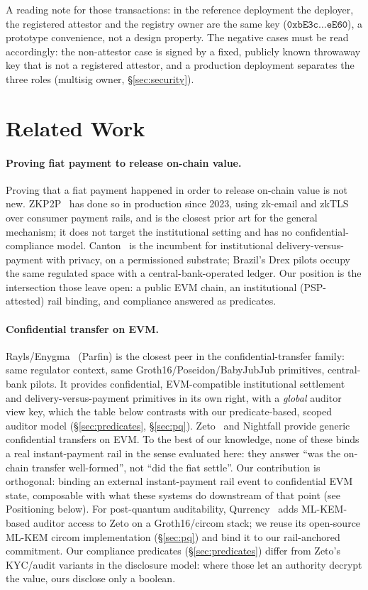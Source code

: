 \documentclass[11pt]{article}
\begin{document}
A reading note for those transactions: in the reference deployment the
deployer, the registered attestor and the registry owner are the same key
($\mathtt{0xbE3c}\ldots\mathtt{eE60}$), a prototype convenience, not a design
property. The negative cases must be read accordingly: the non-attestor case is
signed by a fixed, publicly known throwaway key that is not a registered
attestor, and a production deployment separates the three roles (multisig
owner, \S\ref{sec:security}).

\section{Related Work}
\label{sec:relatedwork}

\paragraph{Proving fiat payment to release on-chain value.}
Proving that a fiat payment happened in order to release on-chain value is not
new. ZKP2P~\cite{zkp2p} has done so in production since 2023, using zk-email
and zkTLS over consumer payment rails, and is the closest prior art for the
general mechanism; it does not target the institutional setting and has no
confidential-compliance model. Canton~\cite{canton} is the incumbent for
institutional delivery-versus-payment with privacy, on a permissioned
substrate; Brazil's Drex pilots occupy the same regulated space with a
central-bank-operated ledger. Our position is the intersection those leave
open: a public EVM chain, an institutional (PSP-attested) rail binding, and
compliance answered as predicates.

\paragraph{Confidential transfer on EVM.}
Rayls/Enygma~\cite{rayls} (Parfin) is the closest peer in the
confidential-transfer family: same regulator context, same
Groth16/Poseidon/BabyJubJub primitives, central-bank pilots. It provides
confidential, EVM-compatible institutional settlement and
delivery-versus-payment primitives in its own right, with a \emph{global}
auditor view key, which the table below contrasts with our predicate-based,
scoped auditor model (\S\ref{sec:predicates}, \S\ref{sec:pq}). Zeto~\cite{zeto}
and Nightfall provide generic confidential transfers on EVM. To the best of our
knowledge, none of these binds a real instant-payment rail in the sense
evaluated here: they answer ``was the on-chain transfer well-formed'', not
``did the fiat settle''. Our contribution is orthogonal: binding an external
instant-payment rail event to confidential EVM state, composable with what
these systems do downstream of that point (see Positioning below). For
post-quantum auditability, Qurrency~\cite{qurrency} adds ML-KEM-based auditor
access to Zeto on a Groth16/circom stack; we reuse its open-source ML-KEM
circom implementation (\S\ref{sec:pq}) and bind it to our rail-anchored
commitment. Our compliance predicates (\S\ref{sec:predicates}) differ from
Zeto's KYC/audit variants in the disclosure model: where those let an
authority decrypt the value, ours disclose only a boolean.
\end{document}
